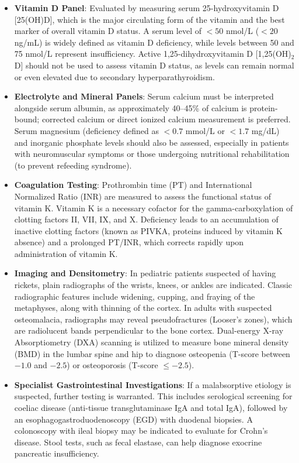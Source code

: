 \begin{itemize}
\item \textbf{Vitamin D Panel}: Evaluated by measuring serum 25-hydroxyvitamin D [25(OH)D], which is the major circulating form of the vitamin and the best marker of overall vitamin D status. A serum level of $< 50$ nmol/L ($< 20$ ng/mL) is widely defined as vitamin D deficiency, while levels between 50 and 75 nmol/L represent insufficiency. Active 1,25-dihydroxyvitamin D [1,25(OH)$_2$D] should not be used to assess vitamin D status, as levels can remain normal or even elevated due to secondary hyperparathyroidism.
\item \textbf{Electrolyte and Mineral Panels}: Serum calcium must be interpreted alongside serum albumin, as approximately 40--45\% of calcium is protein-bound; corrected calcium or direct ionized calcium measurement is preferred. Serum magnesium (deficiency defined as $< 0.7$ mmol/L or $< 1.7$ mg/dL) and inorganic phosphate levels should also be assessed, especially in patients with neuromuscular symptoms or those undergoing nutritional rehabilitation (to prevent refeeding syndrome).
\item \textbf{Coagulation Testing}: Prothrombin time (PT) and International Normalized Ratio (INR) are measured to assess the functional status of vitamin K. Vitamin K is a necessary cofactor for the gamma-carboxylation of clotting factors II, VII, IX, and X. Deficiency leads to an accumulation of inactive clotting factors (known as PIVKA, proteins induced by vitamin K absence) and a prolonged PT/INR, which corrects rapidly upon administration of vitamin K.
\item \textbf{Imaging and Densitometry}: In pediatric patients suspected of having rickets, plain radiographs of the wrists, knees, or ankles are indicated. Classic radiographic features include widening, cupping, and fraying of the metaphyses, along with thinning of the cortex. In adults with suspected osteomalacia, radiographs may reveal pseudofractures (Looser's zones), which are radiolucent bands perpendicular to the bone cortex. Dual-energy X-ray Absorptiometry (DXA) scanning is utilized to measure bone mineral density (BMD) in the lumbar spine and hip to diagnose osteopenia (T-score between $-1.0$ and $-2.5$) or osteoporosis (T-score $\le -2.5$).
\item \textbf{Specialist Gastrointestinal Investigations}: If a malabsorptive etiology is suspected, further testing is warranted. This includes serological screening for coeliac disease (anti-tissue transglutaminase IgA and total IgA), followed by an esophagogastroduodenoscopy (EGD) with duodenal biopsies. A colonoscopy with ileal biopsy may be indicated to evaluate for Crohn's disease. Stool tests, such as fecal elastase, can help diagnose exocrine pancreatic insufficiency.
\end{itemize}

